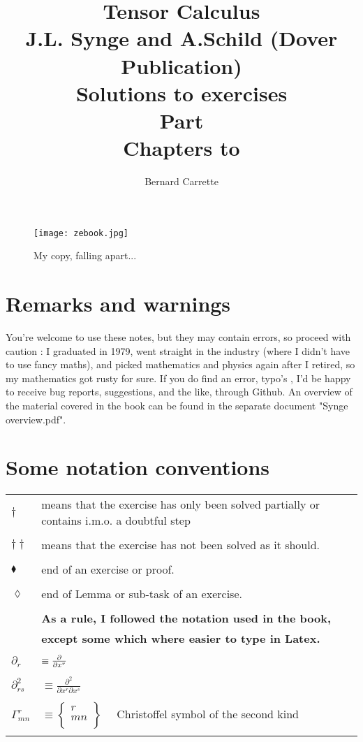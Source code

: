 \documentclass{ut-thesis}
\author{Bernard Carrette}
\title{Tensor Calculus\\J.L. Synge and A.Schild (Dover Publication)\\ Solutions to exercises\\Part \RomanNumeralCaps{1}\\
Chapters \RomanNumeralCaps{1} to \RomanNumeralCaps{4}}
\begin{document}
\maketitle
\begin{figure}%
  \centering
  \texttt{[image: zebook.jpg]}
  \caption{My copy, falling apart...}
  \label{fig:test}
\end{figure}

\section*{Remarks and warnings}
You're welcome to use these notes, but they may contain errors, so proceed with caution : I graduated in 1979, went straight in the industry (where I didn't have to use fancy maths), and picked mathematics and physics again after I retired, so my mathematics got rusty  for sure. If you do find an error, typo's , I'd be happy to receive bug reports, suggestions, and the like, through Github.
An overview of the material covered in the book can be found in the separate document "Synge overview.pdf".

\section*{Some notation conventions}

\begin{center}
\begin{tabular}{ l l }
$\dagger$& means that the exercise has only been solved partially or contains i.m.o. a doubtful step\\\\
$\dagger \dagger$& means that the exercise has not been  solved as it should.\\\\
$\blacklozenge$&end of an exercise or proof.\\\\
$\lozenge$&end of Lemma or sub-task of an exercise.\\\\
&\textbf{As a rule, I followed the notation used in the book,}\\ &\textbf{except some which where easier to type in Latex.}\\\\
$\partial_r $ &$\equiv \pdv{}{x^r}$  \\\\
$\partial^2_{rs}$  &$\equiv \frac{\partial^2}{\partial x^r \partial x^s}$ \\\\
$\Gamma^r_{mn} $&$\equiv 
\begin{Bmatrix}
r\\
m n\\
\end{Bmatrix}\quad$  Christoffel symbol of the second kind\\\\
\end{tabular}
\end{center}

\tableofcontents
\listoffigures




\printbibliography %
\end{document}
